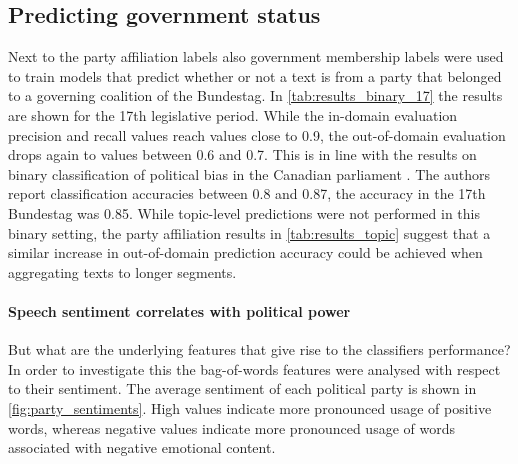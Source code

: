 \documentclass{article}
\begin{document}
%


\subsection{Predicting government status}\label{sec:sentiment_result}
Next to the party affiliation labels also government membership labels were used to train models that predict whether or not a text is from a party that belonged to a governing coalition of the Bundestag. In \autoref{tab:results_binary_17} the results are shown for the 17th legislative period. While the in-domain evaluation precision and recall values reach values close to 0.9, the out-of-domain evaluation drops again to values between 0.6 and 0.7. This is in line with the results on binary classification of political bias in the Canadian parliament \cite{Yu2008}. The authors report classification accuracies between 0.8 and 0.87, the accuracy in the 17th Bundestag was 0.85. While topic-level predictions were not performed in this binary setting, the party affiliation results in \autoref{tab:results_topic} suggest that a similar increase in out-of-domain prediction accuracy could be achieved when aggregating texts to longer segments. \\


\paragraph{Speech sentiment correlates with political power} 
But what are the underlying features that give rise to the classifiers performance? In order to investigate this the bag-of-words features were analysed with respect to their sentiment. The average sentiment of each political party is shown in \autoref{fig:party_sentiments}. High values indicate more pronounced usage of positive words, whereas negative values indicate more pronounced usage of words associated with negative emotional content.
\end{document}
